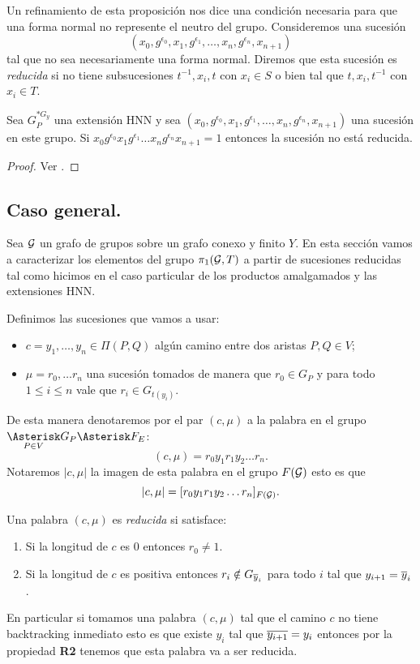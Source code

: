 \documentclass[tesis.tex]{subfiles}
\begin{document}
Un refinamiento de esta proposición nos dice una condición necesaria para que una forma normal no represente el neutro del grupo.
Consideremos una sucesión 
\[
	(x_{0},g^{\epsilon_0},x_{1},g^{\epsilon_1}, \dots, x_{n},g^{\epsilon_n},x_{n+1})
\]
tal que no sea necesariamente una forma normal. 
Diremos que esta sucesión es \emph{reducida} si no tiene subsucesiones $t^{-1},x_i,t$ con $x_i \in S$ o bien tal que $t,x_i,t^{-1}$ con $x_i \in T$.
\begin{teo}[Britton]\label{teo_britton}
	Sea $G_P^{\ast G_y}$ una extensión HNN y sea $(x_{0},g^{\epsilon_0},x_{1},g^{\epsilon_1}, \dots, x_{n},g^{\epsilon_n},x_{n+1})$ una sucesión en este grupo.
	Si $x_{0}g^{\epsilon_0}x_{1}g^{\epsilon_1} \dots x_{n}g^{\epsilon_n}x_{n+1} = 1$ entonces la sucesión no está reducida.
\end{teo}
\begin{proof}
	Ver \cite{lyndon1977combinatorial}.
\end{proof}


\subsection{ Caso general.}
Sea ${\cal G}$ un grafo de grupos sobre un grafo conexo y finito $Y$.
En esta sección vamos a caracterizar los elementos del grupo $\pi_1({\cal G}, T)$ a partir de sucesiones reducidas tal como hicimos en el caso particular de los productos amalgamados y las extensiones HNN.

Definimos las sucesiones que vamos a usar:
\begin{itemize}
	\item $c=y_1, \dots, y_n \in \Pi(P,Q)$ algún camino entre dos aristas $P,Q \in V$;
	\item $\mu = r_0, \dots r_n$ una sucesión tomados de manera que $r_0 \in G_P$ y para todo $ 1 \le i \le n $ vale que $r_i \in G_{t(y_i)}$.
\end{itemize}

De esta manera denotaremos por el par $(c, \mu)$ a la palabra en el grupo $\underset{P \in V}{\Asterisk} G_P \Asterisk F_E$:
\[
(c,\mu) = r_0 y_1 r_1 y_2 \dots r_n.
\]
Notaremos $|c,\mu|$ la imagen de esta palabra en el grupo $F({\cal G})$ esto es que
\[
	|c,\mu| = [r_0 y_1 r_1 y_2 \dots r_n]_{F({\cal G})}.
\]

\begin{deff}
	Una palabra $(c, \mu)$ es \emph{reducida} si satisface:
	\begin{enumerate}[R1.]
		\item Si la longitud de $c$ es $0$ entonces $r_0 \neq 1$.
		\item Si la longitud de $c$ es positiva entonces $r_i \notin G_{\overline y_{i}}$ para todo $i$ tal que $y_{i+1} = \overline y_{i}$.
	\end{enumerate}
\end{deff}
En particular si tomamos una palabra $(c, \mu)$ tal que el camino $c$ no tiene backtracking inmediato esto es que existe $y_i$ tal que $\overline {y_{i+1}} = y_{i}$ entonces por la propiedad \textbf{R2} tenemos que esta palabra va a ser reducida.
\end{document}
